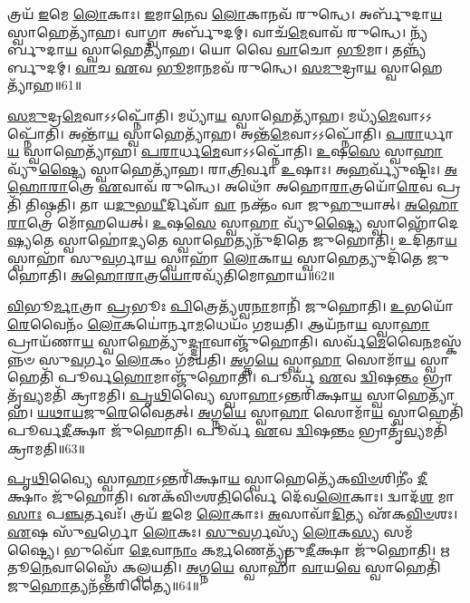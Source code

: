 𑌤𑍍𑌰𑌯᳴ \ul{𑌇}\-𑌮𑍇 \ul{𑌲𑍋}\-𑌕𑌾𑌃।
\-\ul{𑌇}\-𑌮𑌾\-\ul{𑌨𑍇}\-𑌵 \ul{𑌲𑍋}\-𑌕𑌾𑌨𑌵᳴ 𑌰𑍁𑌨𑍍𑌧𑍇।
𑌅𑌰𑍍𑌬𑍁᳴𑌦𑌾\-\ul{𑌯} 𑌸𑍍𑌵𑌾𑌹𑍇𑌤𑍍𑌯𑌾᳴𑌹।
𑌵𑌾𑌗𑍍𑌵𑌾 𑌅𑌰𑍍𑌬𑍁᳴𑌦𑌮𑍍।
𑌵𑌾𑌚᳴\-\ul{𑌮𑍇}\-𑌵𑌾𑌵᳴ 𑌰𑍁𑌨𑍍𑌧𑍇।
𑌨𑍍𑌯᳴𑌰𑍍𑌬𑍁𑌦𑌾\-\ul{𑌯} 𑌸𑍍𑌵𑌾𑌹𑍇𑌤𑍍𑌯𑌾᳴𑌹।
𑌯𑍋 𑌵𑍈 \ul{𑌵𑌾}\-𑌚𑍋 \ul{𑌭𑍂}\-𑌮𑌾।
𑌤𑌨𑍍𑌨𑍍𑌯᳴𑌰𑍍𑌬𑍁𑌦𑌮𑍍।
\-\ul{𑌵𑌾}\-𑌚 \ul{𑌏}\-𑌵 \ul{𑌭𑍂}\-𑌮𑌾\-\ul{𑌨}\-𑌮𑌵᳴ 𑌰𑍁𑌨𑍍𑌧𑍇।
\-\ul{𑌸}\-\-\ul{𑌮𑍁}\-𑌦𑍍𑌰𑌾\-\ul{𑌯} 𑌸𑍍𑌵𑌾𑌹𑍇𑌤𑍍𑌯𑌾᳴𑌹॥61॥

\-\ul{𑌸}\-\-\ul{𑌮𑍁}\-𑌦𑍍𑌰\-\ul{𑌮𑍇}\-𑌵𑌾𑌽𑌽𑌪𑍍𑌨𑍋᳴𑌤𑌿।
𑌮𑌧𑍍𑌯𑌾᳴\-\ul{𑌯} 𑌸𑍍𑌵𑌾𑌹𑍇𑌤𑍍𑌯𑌾᳴𑌹।
𑌮𑌧𑍍𑌯᳴\-\ul{𑌮𑍇}\-𑌵𑌾𑌽𑌽𑌪𑍍𑌨𑍋᳴𑌤𑌿।
𑌅𑌨𑍍𑌤𑌾᳴\-\ul{𑌯} 𑌸𑍍𑌵𑌾𑌹𑍇𑌤𑍍𑌯𑌾᳴𑌹।
𑌅𑌨𑍍𑌤᳴\-\ul{𑌮𑍇}\-𑌵𑌾𑌽𑌽𑌪𑍍𑌨𑍋᳴𑌤𑌿।
\-\ul{𑌪}\-\-\ul{𑌰𑌾}\-𑌰𑍍𑌧𑌾\-\ul{𑌯} 𑌸𑍍𑌵𑌾𑌹𑍇𑌤𑍍𑌯𑌾᳴𑌹।
\-\ul{𑌪}\-\-\ul{𑌰𑌾}\-𑌰𑍍𑌧\-\ul{𑌮𑍇}\-𑌵𑌾𑌽𑌽𑌪𑍍𑌨𑍋᳴𑌤𑌿।
\-\ul{𑌉}\-𑌷\-\ul{𑌸𑍇} 𑌸𑍍𑌵𑌾\-\ul{𑌹𑌾} 𑌵𑍍𑌯𑍁᳴\-\ul{𑌷𑍍𑌟𑍍𑌯𑍈} 𑌸𑍍𑌵𑌾𑌹𑍇𑌤𑍍𑌯𑌾᳴𑌹।
𑌰𑌾\-\ul{𑌤𑍍𑌰𑌿}\-𑌰𑍍𑌵𑌾 \ul{𑌉}\-𑌷𑌾𑌃।
𑌅\-\ul{𑌹}\-𑌰𑍍𑌵𑍍𑌯𑍁᳴𑌷𑍍𑌟𑌿𑌃।
\-\ul{𑌅}\-\-\ul{𑌹𑍋}\-\-\ul{𑌰𑌾}\-𑌤𑍍𑌰𑍇 \ul{𑌏}\-𑌵𑌾𑌵᳴ 𑌰𑍁𑌨𑍍𑌧𑍇।
𑌅𑌥𑍋᳴ 𑌅𑌹𑍋\-\ul{𑌰𑌾}\-𑌤𑍍𑌰𑌯𑍋᳴\-\ul{𑌰𑍇}\-𑌵 𑌪𑍍𑌰𑌤𑌿᳴ 𑌤𑌿𑌷𑍍𑌠𑌤𑌿।
𑌤𑌾 𑌯\-\ul{𑌦𑍁}\-𑌭\-\ul{𑌯𑍀}\-𑌰𑍍𑌦𑌿𑌵𑌾᳴ \ul{𑌵𑌾} 𑌨𑌕𑍍𑌤𑌂᳴ 𑌵𑌾 𑌜𑍁\-\ul{𑌹𑍁}\-𑌯𑌾𑌤𑍍।
\-\ul{𑌅}\-\-\ul{𑌹𑍋}\-\-\ul{𑌰𑌾}\-𑌤𑍍𑌰𑍇 𑌮𑍋᳴𑌹𑌯𑍇𑌤𑍍।
\-\ul{𑌉}\-𑌷\-\ul{𑌸𑍇} 𑌸𑍍𑌵𑌾\-\ul{𑌹𑌾} 𑌵𑍍𑌯𑍁᳴\-\ul{𑌷𑍍𑌟𑍍𑌯𑍈} 𑌸𑍍𑌵𑌾𑌹𑍋᳴𑌦𑍇\-\ul{𑌷𑍍𑌯}\-𑌤𑍇 𑌸𑍍𑌵𑌾𑌹𑍋॑\-\ul{𑌦𑍍𑌯}\-𑌤𑍇 𑌸𑍍𑌵𑌾𑌹𑍇𑌤𑍍𑌯𑌨𑍁᳴𑌦𑌿𑌤𑍇 𑌜𑍁𑌹𑍋𑌤𑌿।
𑌉𑌦𑌿᳴𑌤𑌾\-\ul{𑌯} 𑌸𑍍𑌵𑌾𑌹𑌾᳴ 𑌸𑍁\-\ul{𑌵}\-𑌰𑍍𑌗𑌾\-\ul{𑌯} 𑌸𑍍𑌵𑌾𑌹𑌾᳴ \ul{𑌲𑍋}\-𑌕𑌾\-\ul{𑌯} 𑌸𑍍𑌵𑌾𑌹𑍇𑌤𑍍𑌯𑍁𑌦𑌿᳴𑌤𑍇 𑌜𑍁𑌹𑍋𑌤𑌿।
\-\ul{𑌅}\-\-\ul{𑌹𑍋}\-\-\ul{𑌰𑌾}\-𑌤𑍍𑌰\-\ul{𑌯𑍋}\-𑌰𑌵𑍍𑌯᳴𑌤𑌿𑌮𑍋𑌹𑌾𑌯॥62॥\anuvakamend[\-\ul{𑌏}\-\-\ul{𑌕𑍋}\-\-\ul{𑌤𑍍𑌤}\-𑌰𑌂 𑌜𑍁᳴𑌹𑍋𑌤𑌿 \ul{𑌪𑍍𑌰}\-𑌯𑍁𑌤𑌾᳴\-\ul{𑌯} 𑌸𑍍𑌵𑌾𑌹𑍇𑌤𑍍𑌯𑌾᳴𑌹 𑌸\-\ul{𑌮𑍁}\-𑌦𑍍𑌰𑌾\-\ul{𑌯} 𑌸𑍍𑌵𑌾𑌹𑍇\-\ul{𑌤𑍍𑌯𑌾}\-𑌹𑌾\-\ul{𑌹}\-𑌰𑍍𑌵𑍍𑌯𑍁᳴𑌷𑍍𑌟𑌿𑌃 \ul{𑌸}\-𑌪𑍍𑌤 𑌚᳴]

\-\ul{𑌵𑌿}\-𑌭𑍂\-\ul{𑌰𑍍𑌮𑌾}\-𑌤𑍍𑌰𑌾 \ul{𑌪𑍍𑌰}\-𑌭𑍂𑌃 \ul{𑌪𑌿}\-𑌤𑍍𑌰𑍇𑌤𑍍𑌯᳴𑌶𑍍𑌵\-\ul{𑌨𑌾}\-𑌮𑌾𑌨𑌿᳴ 𑌜𑍁𑌹𑍋𑌤𑌿।
\-\ul{𑌉}\-𑌭𑌯𑍋᳴\-\ul{𑌰𑍇}\-𑌵𑍈𑌨𑌂᳴ \ul{𑌲𑍋}\-𑌕𑌯𑍋॑𑌰𑍍𑌨𑌾\-\ul{𑌮}\-𑌧𑍇𑌯𑌂᳴ 𑌗𑌮𑌯𑌤𑌿।
𑌆𑌯᳴𑌨𑌾\-\ul{𑌯} 𑌸𑍍𑌵𑌾\-\ul{𑌹𑌾} 𑌪𑍍𑌰𑌾𑌯᳴𑌣𑌾\-\ul{𑌯} 𑌸𑍍𑌵𑌾𑌹𑍇𑌤𑍍𑌯𑍁᳴\-\ul{𑌦𑍍𑌦𑍍𑌰𑌾}\-𑌵𑌾𑌞𑍍𑌜𑍁᳴𑌹𑍋𑌤𑌿।
𑌸𑌰𑍍𑌵᳴\-\ul{𑌮𑍇}\-𑌵𑍈\-\ul{𑌨}\-𑌮𑌸𑍍𑌕᳴𑌨𑍍𑌨𑍞 𑌸𑍁\-\ul{𑌵}\-𑌰𑍍𑌗𑌂 \ul{𑌲𑍋}\-𑌕𑌂 𑌗᳴𑌮𑌯𑌤𑌿।
\-\ul{𑌅}\-𑌗𑍍𑌨\-\ul{𑌯𑍇} 𑌸𑍍𑌵𑌾\-\ul{𑌹𑌾} 𑌸𑍋𑌮𑌾᳴\-\ul{𑌯} 𑌸𑍍𑌵𑌾𑌹𑍇𑌤𑌿᳴ 𑌪𑍂𑌰𑍍𑌵\-\ul{𑌹𑍋}\-𑌮𑌾𑌞𑍍𑌜𑍁᳴𑌹𑍋𑌤𑌿।
𑌪𑍂𑌰𑍍𑌵᳴ \ul{𑌏}\-𑌵 \ul{𑌦𑍍𑌵𑌿}\-𑌷\-\ul{𑌨𑍍𑌤𑌂} 𑌭𑍍𑌰𑌾𑌤𑍃᳴\-\ul{𑌵𑍍𑌯}\-𑌮𑌤𑌿᳴ 𑌕𑍍𑌰𑌾𑌮𑌤𑌿।
\-\ul{𑌪𑍃}\-\-\ul{𑌥𑌿}\-𑌵𑍍𑌯𑍈 𑌸𑍍𑌵𑌾\-\ul{𑌹𑌾}\-\-𑌽𑌨𑍍𑌤𑌰𑌿᳴𑌕𑍍𑌷𑌾\-\ul{𑌯} 𑌸𑍍𑌵𑌾𑌹𑍇𑌤𑍍𑌯𑌾᳴𑌹।
\-\ul{𑌯}\-\-\ul{𑌥𑌾}\-\-\ul{𑌯}\-𑌜𑍁\-\ul{𑌰𑍇}\-𑌵𑍈𑌤𑌤𑍍।
\-\ul{𑌅}\-𑌗𑍍𑌨\-\ul{𑌯𑍇} 𑌸𑍍𑌵𑌾\-\ul{𑌹𑌾} 𑌸𑍋𑌮𑌾᳴\-\ul{𑌯} 𑌸𑍍𑌵𑌾𑌹𑍇𑌤𑌿᳴ 𑌪𑍂𑌰𑍍𑌵\-\ul{𑌦𑍀}\-𑌕𑍍𑌷𑌾 𑌜𑍁᳴𑌹𑍋𑌤𑌿।
𑌪𑍂𑌰𑍍𑌵᳴ \ul{𑌏}\-𑌵 \ul{𑌦𑍍𑌵𑌿}\-𑌷\-\ul{𑌨𑍍𑌤𑌂} 𑌭𑍍𑌰𑌾𑌤𑍃᳴\-\ul{𑌵𑍍𑌯}\-𑌮𑌤𑌿᳴ 𑌕𑍍𑌰𑌾𑌮𑌤𑌿॥63॥

\-\ul{𑌪𑍃}\-\-\ul{𑌥𑌿}\-𑌵𑍍𑌯𑍈 𑌸𑍍𑌵𑌾\-\ul{𑌹𑌾}\-\-𑌽𑌨𑍍𑌤𑌰𑌿᳴𑌕𑍍𑌷𑌾\-\ul{𑌯} 𑌸𑍍𑌵𑌾𑌹𑍇𑌤𑍍𑌯𑍇᳴𑌕\-\ul{𑌵𑌿}\-\-\ul{𑍞}\-𑌶𑌿𑌨𑍀𑌂॑ \ul{𑌦𑍀}\-𑌕𑍍𑌷𑌾𑌂 𑌜𑍁᳴𑌹𑍋𑌤𑌿।
𑌏𑌕᳴𑌵𑌿𑍞𑌶\-\ul{𑌤𑌿}\-𑌰𑍍𑌵𑍈 𑌦𑍇᳴𑌵\-\ul{𑌲𑍋}\-𑌕𑌾𑌃।
𑌦𑍍𑌵𑌾𑌦᳴\-\ul{𑌶} 𑌮𑌾\-\ul{𑌸𑌾𑌃} 𑌪\-\ul{𑌞𑍍𑌚}\-𑌰𑍍𑌤𑌵𑌃᳴।
𑌤𑍍𑌰𑌯᳴ \ul{𑌇}\-𑌮𑍇 \ul{𑌲𑍋}\-𑌕𑌾𑌃।
\-\ul{𑌅}\-𑌸𑌾𑌵𑌾᳴\-\ul{𑌦𑌿}\-𑌤𑍍𑌯 𑌏᳴𑌕\-\ul{𑌵𑌿}\-\-\ul{𑍞}\-𑌶𑌃।
\-\ul{𑌏}\-𑌷 𑌸𑍁᳴\-\ul{𑌵}\-𑌰𑍍𑌗𑍋 \ul{𑌲𑍋}\-𑌕𑌃।
\-\ul{𑌸𑍁}\-\-\ul{𑌵}\-𑌰𑍍𑌗𑌸𑍍𑌯᳴ \ul{𑌲𑍋}\-𑌕\-\ul{𑌸𑍍𑌯} 𑌸𑌮᳴𑌷𑍍𑌟𑍍𑌯𑍈।
𑌭𑍁𑌵𑍋᳴ \ul{𑌦𑍇}\-𑌵𑌾\-\ul{𑌨𑌾𑌂} 𑌕\-\ul{𑌰𑍍𑌮}\-𑌣𑍇𑌤𑍍𑌯𑍃᳴𑌤𑍁\-\ul{𑌦𑍀}\-𑌕𑍍𑌷𑌾 𑌜𑍁᳴𑌹𑍋𑌤𑌿।
\-\ul{𑌋}\-𑌤𑍂\-\ul{𑌨𑍇}\-𑌵𑌾𑌸𑍍𑌮𑍈᳴ 𑌕𑌲𑍍𑌪𑌯𑌤𑌿।
\-\ul{𑌅}\-𑌗𑍍𑌨\-\ul{𑌯𑍇} 𑌸𑍍𑌵𑌾𑌹𑌾᳴ \ul{𑌵𑌾}\-𑌯\-\ul{𑌵𑍇} 𑌸𑍍𑌵𑌾𑌹𑍇𑌤𑌿᳴ 𑌜𑍁\-\ul{𑌹𑍋}\-𑌤𑍍𑌯𑌨᳴𑌨𑍍𑌤𑌰𑌿𑌤𑍍𑌯𑍈॥64॥

